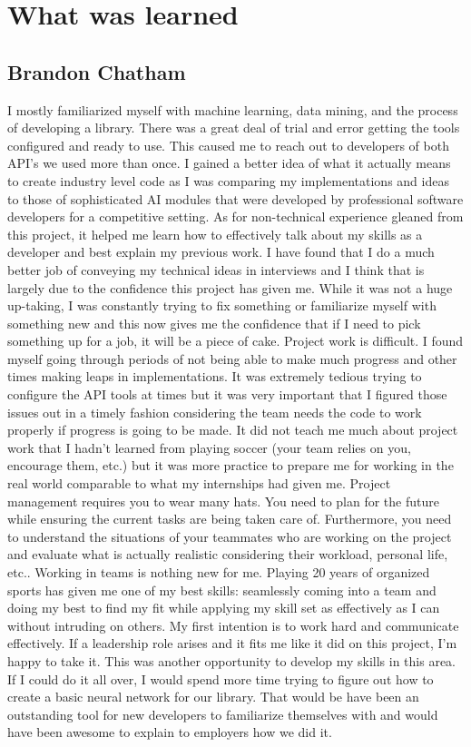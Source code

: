 \documentclass[10pt,letterpaper,onecolumn,draftclsnofoot]{IEEEtran}
\begin{document}
\section{What was learned}
\subsection{Brandon Chatham}
I mostly familiarized myself with machine learning, data mining, and the process of developing a library. There was a great deal of trial and error getting the tools configured and ready to use. This caused me to reach out to developers of both API's we used more than once. I gained a better idea of what it actually means to create industry level code as I was comparing my implementations and ideas to those of sophisticated AI modules that were developed by professional software developers for a competitive setting. 
As for non-technical experience gleaned from this project, it helped me learn how to effectively talk about my skills as a developer and best explain my previous work. I have found that I do a much better job of conveying my technical ideas in interviews and I think that is largely due to the confidence this project has given me. While it was not a huge up-taking, I was constantly trying to fix something or familiarize myself with something new and this now gives me the confidence that if I need to pick something up for a job, it will be a piece of cake. 
Project work is difficult. I found myself going through periods of not being able to make much progress and other times making leaps in implementations. It was extremely tedious trying to configure the API tools at times but it was very important that I figured those issues out in a timely fashion considering the team needs the code to work properly if progress is going to be made. It did not teach me much about project work that I hadn't learned from playing soccer (your team relies on you, encourage them, etc.) but it was more practice to prepare me for working in the real world comparable to what my internships had given me. 
Project management requires you to wear many hats. You need to plan for the future while ensuring the current tasks are being taken care of. Furthermore, you need to understand the situations of your teammates who are working on the project and evaluate what is actually realistic considering their workload, personal life, etc.. 
Working in teams is nothing new for me. Playing 20 years of organized sports has given me one of my best skills: seamlessly coming into a team and doing my best to find my fit while applying my skill set as effectively as I can without intruding on others. My first intention is to work hard and communicate effectively. If a leadership role arises and it fits me like it did on this project, I'm happy to take it. This was another opportunity to develop my skills in this area.
If I could do it all over, I would spend more time trying to figure out how to create a basic neural network for our library. That would be have been an outstanding tool for new developers to familiarize themselves with and would have been awesome to explain to employers how we did it.
\end{document}

